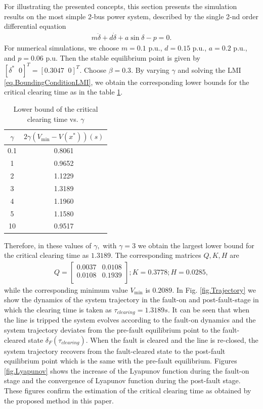 \documentclass[final]{IEEEtran}
\begin{document}
For illustrating the presented concepts, this section presents the
simulation results on the most simple 2-bus power system,
described by the single 2-nd order differential equation
\begin{align}
  m \ddot{\delta} +d \dot{\delta} + a \sin\delta - p=0.
\end{align}
For numerical simulations, we choose $m=0.1$ p.u., $d=0.15$ p.u.,
$a= 0.2$ p.u., and $p=0.06$ p.u. Then the stable equilibrium point
is given by $[\delta^* \;\;0]^T=[0.3047 \;\; 0]^T.$ Choose
$\beta=0.3.$ By varying $\gamma$ and solving the LMI
\eqref{eq.BoundingConditionLMI}, we obtain the corresponding lower
bounds for the critical clearing time as in the table
\ref{tab.CCT}.

\begin{table}[ht!]
\centering
\begin{tabular}{|c|c|}
  \hline
  $\gamma$ & $2\gamma (V_{\min}-V(x^*)) (s)$ \\
  \hline
  0.1  & 0.8061 \\
  1 & 0.9652 \\
  2 & 1.1229 \\
  3 & 1.3189 \\
  4 & 1.1960 \\
  5 & 1.1580\\
  10 & 0.9517\\
  \hline
\end{tabular}
\caption{Lower bound of the critical clearing time vs.
$\gamma$}\label{tab.CCT}
\end{table}

Therefore, in these values of $\gamma,$ with $\gamma=3$  we obtain
the largest lower bound for the critical clearing time as
$1.3189.$ The corresponding matrices $Q,K,H$ are
\begin{align}
Q=\left[   \begin{array}{ccccc}
          0.0037   & 0.0108 \\
          0.0108  & 0.1939\\
        \end{array}\right]; K= 0.3778;H=0.0285,
\end{align}
while the corresponding minimum value $V_{\min}$ is $0.2089.$ In
Fig. \ref{fig.Trajectory} we show the dynamics of the system
trajectory in the fault-on and post-fault-stage in which the
clearing time is taken as $\tau_{clearing}=1.3189 s.$ It can be seen
that when the line is tripped the system evolves according to the
fault-on dynamics and the system trajectory deviates from the
pre-fault equilibrium point to the fault-cleared state
$\delta_F(\tau_{clearing}).$ When the fault is cleared and the
line is re-closed, the system trajectory recovers from the
fault-cleared state to the post-fault equilibrium point which is
the same with the pre-fault equilibrium. Figures
\ref{fig.Lyapunov} shows the increase of the Lyapunov function
during the fault-on stage and the convergence of Lyapunov function
during the post-fault stage. These figures confirm the estimation
of the critical clearing time as obtained by the proposed method
in this paper.
\end{document}
